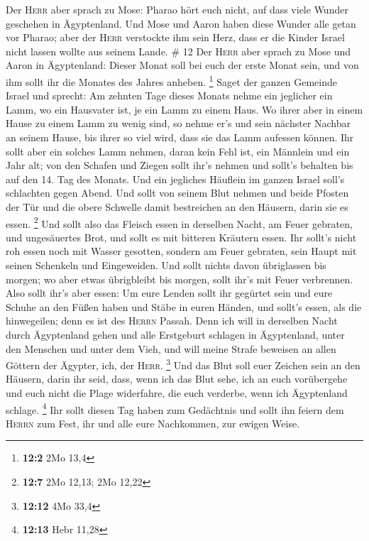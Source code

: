  Der \textsc{Herr} aber sprach zu Mose: Pharao hört euch
nicht, auf dass viele Wunder geschehen in Ägyptenland. 
Und Mose und Aaron haben diese Wunder alle getan vor Pharao; aber der
\textsc{Herr} verstockte ihm sein Herz, dass er die Kinder Israel nicht
lassen wollte aus seinem Lande. \# 12  Der \textsc{Herr}
aber sprach zu Mose und Aaron in Ägyptenland:  Dieser
Monat soll bei euch der erste Monat sein, und von ihm sollt ihr die
Monates des Jahres anheben. \footnote{\textbf{12:2} 2Mo 13,4}
 Saget der ganzen Gemeinde Israel und sprecht: Am zehnten
Tage dieses Monats nehme ein jeglicher ein Lamm, wo ein Hausvater ist,
je ein Lamm zu einem Haus.  Wo ihrer aber in einem Hause
zu einem Lamm zu wenig sind, so nehme er's und sein nächster Nachbar an
seinem Hause, bis ihrer so viel wird, dass sie das Lamm aufessen können.
 Ihr sollt aber ein solches Lamm nehmen, daran kein Fehl
ist, ein Männlein und ein Jahr alt; von den Schafen und Ziegen sollt
ihr's nehmen  und sollt's behalten bis auf den 14. Tag des
Monats. Und ein jegliches Häuflein im ganzen Israel soll's schlachten
gegen Abend.  Und sollt von seinem Blut nehmen und beide
Pfosten der Tür und die obere Schwelle damit bestreichen an den Häusern,
darin sie es essen. \footnote{\textbf{12:7} 2Mo 12,13; 2Mo 12,22}
 Und sollt also das Fleisch essen in derselben Nacht, am
Feuer gebraten, und ungesäuertes Brot, und sollt es mit bitteren
Kräutern essen.  Ihr sollt's nicht roh essen noch mit
Wasser gesotten, sondern am Feuer gebraten, sein Haupt mit seinen
Schenkeln und Eingeweiden.  Und sollt nichts davon
übriglassen bis morgen; wo aber etwas übrigbleibt bis morgen, sollt
ihr's mit Feuer verbrennen.  Also sollt ihr's aber essen:
Um eure Lenden sollt ihr gegürtet sein und eure Schuhe an den Füßen
haben und Stäbe in euren Händen, und sollt's essen, als die hinwegeilen;
denn es ist des \textsc{Herrn} Passah.  Denn ich will in
derselben Nacht durch Ägyptenland gehen und alle Erstgeburt schlagen in
Ägyptenland, unter den Menschen und unter dem Vieh, und will meine
Strafe beweisen an allen Göttern der Ägypter, ich, der \textsc{Herr}.
\footnote{\textbf{12:12} 4Mo 33,4}  Und das Blut soll
euer Zeichen sein an den Häusern, darin ihr seid, dass, wenn ich das
Blut sehe, ich an euch vorübergehe und euch nicht die Plage widerfahre,
die euch verderbe, wenn ich Ägyptenland schlage. \footnote{\textbf{12:13}
  Hebr 11,28}  Ihr sollt diesen Tag haben zum Gedächtnis
und sollt ihn feiern dem \textsc{Herrn} zum Fest, ihr und alle eure
Nachkommen, zur ewigen Weise.

